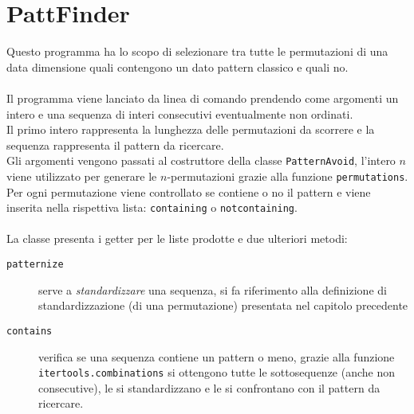\section{PattFinder}
Questo programma ha lo scopo di selezionare tra tutte le permutazioni di una data dimensione quali contengono un dato pattern classico e quali no.\\\\
Il programma viene lanciato da linea di comando prendendo come argomenti un intero e una sequenza di interi consecutivi eventualmente non ordinati.\\
Il primo intero rappresenta la lunghezza delle permutazioni da scorrere e la sequenza rappresenta il pattern da ricercare.\\
Gli argomenti vengono passati al costruttore della classe \texttt{PatternAvoid}, l'intero $n$ viene utilizzato per generare le $n$-permutazioni grazie alla funzione \texttt{permutations}. Per ogni permutazione viene controllato se contiene o no il pattern e viene inserita nella rispettiva lista: \texttt{containing} o \texttt{notcontaining}.\\\\
La classe presenta i getter per le liste prodotte e due ulteriori metodi: 
\begin{description}
\item[\texttt{patternize}] serve a \textit{standardizzare} una sequenza, si fa riferimento alla definizione di standardizzazione (di una permutazione) presentata nel capitolo precedente
\item[\texttt{contains}] verifica se una sequenza contiene un pattern o meno, grazie alla funzione \texttt{itertools.combinations} si ottengono tutte le sottosequenze (anche non consecutive), le si standardizzano e le si confrontano con il pattern da ricercare.
\end{description}

